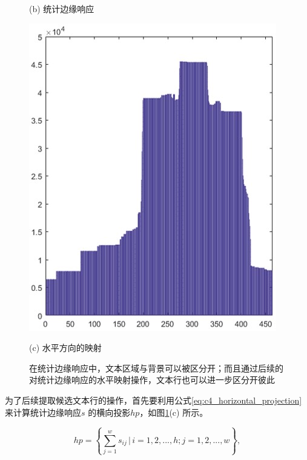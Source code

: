 \begin{figure}[!h]
\begin{minipage}[t]{0.35\linewidth}
        \centerline{\small (b) 统计边缘响应}
        \end{minipage}
        \begin{minipage}[t]{0.25\linewidth}
        \centering
        \includegraphics[width=\textwidth]{./figures/c4_horizontal_projection.jpg}
        \centerline{\small (c) 水平方向的映射}
        \end{minipage}
        \caption{在统计边缘响应中，文本区域与背景可以被区分开；而且通过后续的对统计边缘响应的水平映射操作，文本行也可以进一步区分开彼此}
        \label{fig.c4_static_skeleton_response}
        \end{figure}

        为了后续提取候选文本行的操作，首先要利用公式\ref{eq:c4_horizontal_projection} 来计算统计边缘响应$s$ 的横向投影$hp$，如图\ref{fig.c4_static_skeleton_response}(c) 所示。

        \begin{equation}
        hp= \left\{ \sum_{j=1}^w s_{ij} \, | \, i=1,2,...,h;j=1,2,...,w \right\},
        \label{eq:c4_horizontal_projection}
        \end{equation}

